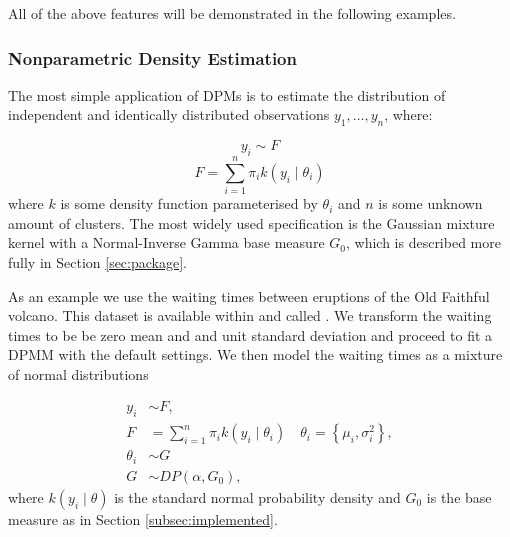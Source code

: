 \documentclass[nojss]{jss}
\begin{document}
All of the above features will be demonstrated in the following examples.

\subsubsection{Nonparametric Density Estimation}
The most simple application of DPMs is to estimate the distribution of independent and identically distributed observations $y_1,\ldots,y_n$, where:

$$y_i \sim F$$
$$F = \sum _{i=1} ^n \pi _i k(y_i \mid \theta _i)$$
where $k$ is some density function parameterised by $\theta _i$ and $n$ is some unknown amount of clusters. The most widely used specification is the Gaussian mixture kernel with a Normal-Inverse Gamma base measure $G_0$, which is described more fully in Section \ref{sec:package}.

As an example we use the waiting times between eruptions of the Old Faithful volcano. This dataset is available within  and called . We transform the waiting times to be be zero mean and and unit standard deviation and proceed to fit a DPMM with the default settings. We then model the waiting times as a mixture of normal distributions

\begin{align*}
y_i & \sim F, \\
F & = \sum _{i=1} ^n \pi _i k(y_i \mid \theta _i) \quad \theta _i = \left\lbrace \mu _i , \sigma ^2 _i \right\rbrace , \\
\theta _i & \sim G \\
G & \sim DP(\alpha , G_0),
\end{align*}
where $k(y _i \mid \theta )$ is the standard normal probability density and $G_0$ is the base measure as in Section \ref{subsec:implemented}.

\begin{Schunk}
\end{Schunk}
\end{document}
